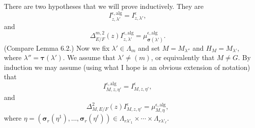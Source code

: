 \documentclass{amsart}
\begin{document}
There are two hypotheses that we will prove inductively.  They
are
\begin{equation}\label{eqn:tag1}
I^{\epsilon,\text{alg}}_{z,\lambda'} =
I^{\epsilon}_{z,\lambda'},%
\end{equation}
and
\begin{equation}\label{eqn:tag2}
\Delta^{m,2}_{E/F}(z)I^{\epsilon,\text{alg}}_{z,\lambda'} =
  \mu^{\epsilon,\text{alg}}_{\pmb\sigma(\lambda')}. %
\end{equation}
(Compare Lemma 6.2.)
Now we fix $\lambda'\in\Lambda_m$ and set $M=M_{\lambda''}$ and  $H_M = M_{\lambda'}$,
where $\lambda'' = \pmb\tau(\lambda')$.  We assume that $\lambda'\ne(m)$, or
equivalently that $M\ne G$.  By induction we may assume (using what I hope
is an obvious extension of notation) that
\begin{equation}\label{eqn:tag1'}
I^{\epsilon,\text{alg}}_{M,z,\eta'} =
I^{\epsilon}_{M,z,\eta'}, %
\end{equation}
and
\begin{equation}\label{eqn:tag2'}
\Delta^{2}_{M,E/F}(z)I^\epsilon_{M,z,\eta'} =
\mu^{\epsilon,\text{alg}}_{M,\eta},%
\end{equation}
where $\eta =(\pmb\sigma_r(\eta^1),\ldots,\pmb\sigma_r(\eta^\ell))\in
   \Lambda_{r\lambda'_1}\times\cdots\times \Lambda_{r\lambda'_\ell}$.
\end{document}
